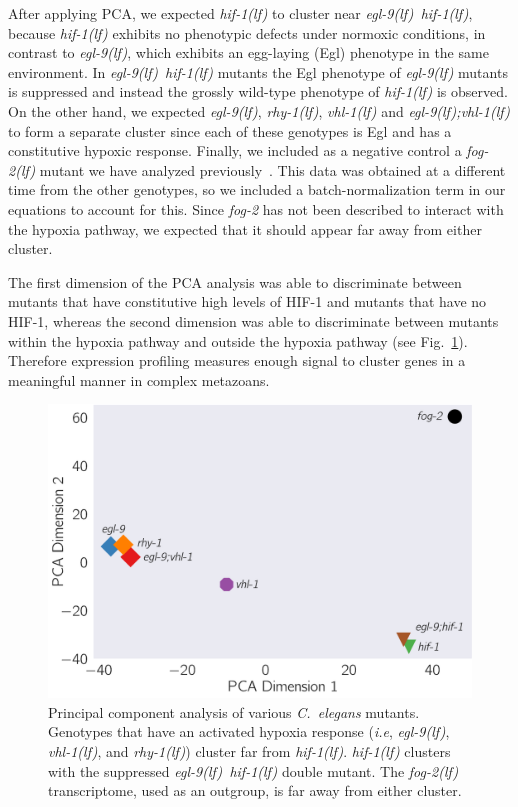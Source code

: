 \documentclass[10pt, onecolumn]{article}
\newcommand{\cel}{\emph{C.~elegans}}
\newcommand{\gene}[1]{\emph{#1}}
\newcommand{\fog}{\emph{\mbox{fog-2(lf)}}}
\newcommand{\egl}{\emph{\mbox{egl-9}(lf)}}
\newcommand{\rhy}{\emph{\mbox{rhy-1}(lf)}}
\newcommand{\vhl}{\emph{\mbox{vhl-1}(lf)}}
\newcommand{\eglvhl}{\emph{\mbox{egl-9(lf);vhl-1(lf)}}}
\newcommand{\eglhif}{\emph{\mbox{egl-9(lf)}~\mbox{hif-1(lf)}}}
\newcommand{\hif}{\emph{\mbox{hif-1(lf)}}}
\newcommand{\hifp}{HIF-1}
\begin{document}
After applying PCA, we expected \hif{} to cluster near \eglhif{}, because
\hif{} exhibits no phenotypic defects under normoxic conditions, in contrast to
\egl{}, which exhibits an egg-laying (Egl) phenotype in the same environment.
In \eglhif{} mutants the Egl phenotype of \egl{} mutants is suppressed and instead
the grossly wild-type phenotype of \hif{} is observed. On the other hand, we
expected \egl{}, \rhy{}, \vhl{} and \eglvhl{} to form a separate cluster since
each of these genotypes is Egl and has a constitutive hypoxic response. Finally,
we included as a negative control a \fog{} mutant we have analyzed
previously~\cite{Angeles-Albores2016a}. This data was obtained at a different
time from the other genotypes, so we included a batch-normalization term in our
equations to account for this. Since \gene{fog-2} has not been described
to interact with the hypoxia pathway, we expected that it should appear far away
from either cluster.

The first dimension of the PCA analysis was able to discriminate between mutants
that have constitutive high levels of \hifp{} and mutants that have no \hifp{},
whereas the second dimension was able to discriminate between mutants within the
hypoxia pathway and outside the hypoxia pathway (see Fig.~\ref{fig:pca}).
Therefore expression profiling measures enough signal to cluster genes in a
meaningful manner in complex metazoans.

\begin{figure}[tbhp]
\centering
\includegraphics[width=0.5\linewidth]{../figs/pca.pdf}
\caption{
Principal component analysis of various \cel{} mutants. Genotypes that have an
activated hypoxia response (\emph{i.e}, \egl{}, \vhl{}, and \rhy{}) cluster far
from \hif{}. \hif{} clusters with the suppressed \eglhif{} double mutant.
The \fog{} transcriptome, used as an outgroup, is far away from either cluster.
}
\label{fig:pca}
\end{figure}
\end{document}
